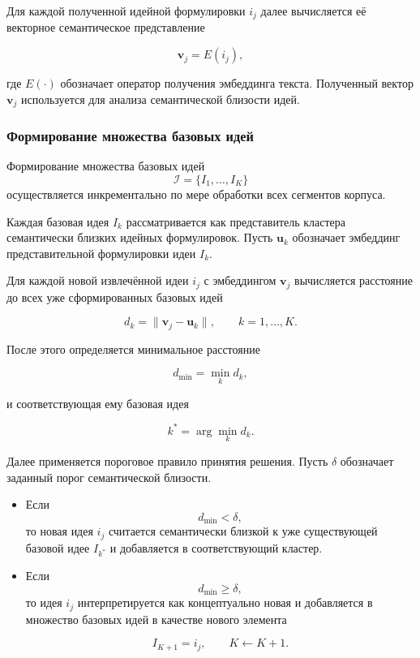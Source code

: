\documentclass[review,3p,times]{elsarticle}
\begin{document}
Для каждой полученной идейной формулировки $i_j$ далее вычисляется её векторное семантическое представление

\[
\mathbf{v}_j = E(i_j),
\]

где $E(\cdot)$ обозначает оператор получения эмбеддинга текста. Полученный вектор $\mathbf{v}_j$ используется для анализа семантической близости идей.

\subsubsection{Формирование множества базовых идей}

Формирование множества базовых идей 
\[
\mathcal{I}=\{I_1,\dots,I_K\}
\]
осуществляется инкрементально по мере обработки всех сегментов корпуса.

Каждая базовая идея $I_k$ рассматривается как представитель кластера семантически близких идейных формулировок. Пусть $\mathbf{u}_k$ обозначает эмбеддинг представительной формулировки идеи $I_k$.

Для каждой новой извлечённой идеи $i_j$ с эмбеддингом $\mathbf{v}_j$ вычисляется расстояние до всех уже сформированных базовых идей

\[
d_k = \|\mathbf{v}_j - \mathbf{u}_k\|, 
\qquad k=1,\dots,K.
\]

После этого определяется минимальное расстояние

\[
d_{\min} = \min_{k} d_k,
\]

и соответствующая ему базовая идея

\[
k^* = \arg\min_{k} d_k.
\]

Далее применяется пороговое правило принятия решения. Пусть $\delta$ обозначает заданный порог семантической близости.

\begin{itemize}

\item Если
\[
d_{\min} < \delta,
\]
то новая идея $i_j$ считается семантически близкой к уже существующей базовой идее $I_{k^*}$ и добавляется в соответствующий кластер.

\item Если
\[
d_{\min} \ge \delta,
\]
то идея $i_j$ интерпретируется как концептуально новая и добавляется в множество базовых идей в качестве нового элемента

\[
I_{K+1} = i_j,
\qquad
K \leftarrow K+1.
\]

\end{itemize}
\end{document}
